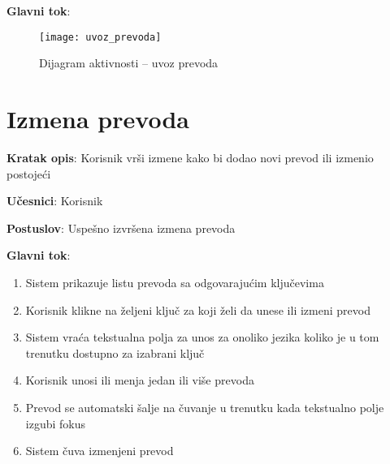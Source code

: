\textbf{Glavni tok}:
    

\begin{figure}[H]
    \centering
    \texttt{[image: uvoz\_prevoda]}
    \caption{Dijagram aktivnosti -- uvoz prevoda}
\end{figure}


\section{Izmena prevoda}

\textbf{Kratak opis}: Korisnik vrši izmene kako bi dodao novi prevod ili izmenio postojeći

\textbf{Učesnici}: Korisnik

\textbf{Postuslov}: Uspešno izvršena izmena prevoda

\textbf{Glavni tok}:
\begin{enumerate}
    \item Sistem prikazuje listu prevoda sa odgovarajućim ključevima
    \item Korisnik klikne na željeni ključ za koji želi da unese ili izmeni prevod
    \item Sistem vraća tekstualna polja za unos za onoliko jezika koliko je u tom 
    trenutku dostupno za izabrani ključ
    \item Korisnik unosi ili menja jedan ili više prevoda
    \item Prevod se automatski šalje na čuvanje u trenutku kada tekstualno polje izgubi fokus
    \item Sistem čuva izmenjeni prevod
\end{enumerate}

